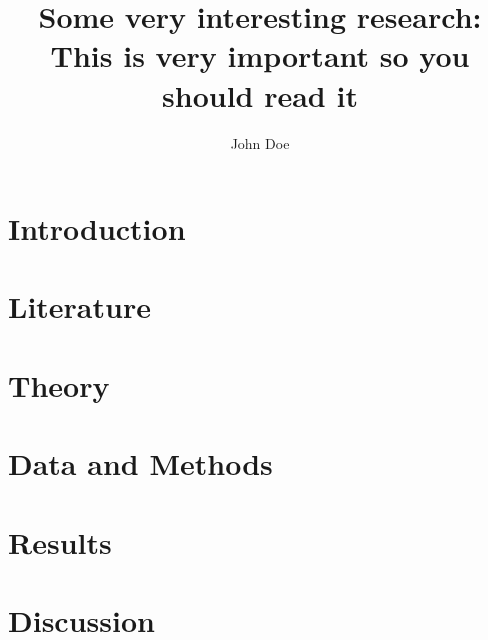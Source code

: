 \documentclass[11pt, xcolor=dvipsnames]{article}
\author[1]{John Doe}
\affil[1]{Universität Konstanz, 01/1001158}
\title{Some very interesting research: This is very important so you should read it}
\begin{document}


\restoregeometry

\maketitle

\section*{Introduction}

\nocite{*}
\section*{Literature}


\section*{Theory}


\section*{Data and Methods}


\section*{Results}


\section*{Discussion}


\newpage
\newpage
\thispagestyle{empty}
\begingroup
{}
\printbibliography
\endgroup
\end{document}

